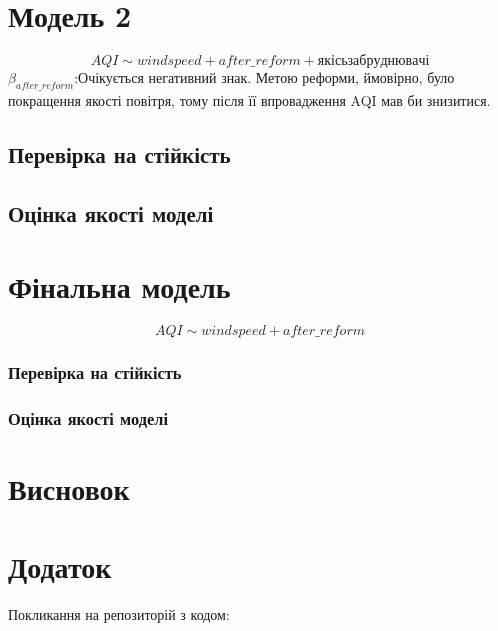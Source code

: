\documentclass{article}
\begin{document}
\newpage
\section{Модель 2}
$$AQI \sim windspeed + after\_reform + якісь забруднювачі$$
   $\beta_{after\_reform}$:Очікується негативний знак. 
   Метою реформи, ймовірно, було покращення якості повітря,
   тому після її впровадження AQI мав би знизитися.
\subsection{Перевірка на стійкість}
\subsection{Оцінка якості моделі}

\newpage
\section{Фінальна модель}
$$AQI \sim windspeed + after\_reform $$
\subsubsection{Перевірка на стійкість}
\subsubsection{Оцінка якості моделі}

\newpage
\section{Висновок}

\newpage
\section{Додаток}
Покликання на репозиторій з кодом:
\url{}{}
\end{document}
